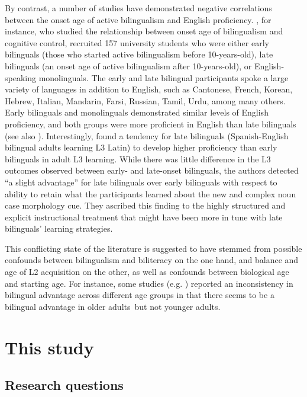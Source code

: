 \documentclass[output=paper,modfonts,nonflat,newtxmath]{langsci/langscibook}
\begin{document}
By contrast, a number of studies have demonstrated negative correlations between the onset age of active bilingualism and English proficiency. \citet{LukEtAl2011}, for instance, who studied the relationship between onset age of bilingualism and cognitive control, recruited 157 university students who were either early bilinguals (those who started active bilingualism before 10-years-old), late bilinguals (an onset age of active bilingualism after 10-years-old), or English-speaking monolinguals. The early and late bilingual participants spoke a large variety of languages in addition to English, such as Cantonese, French, Korean, Hebrew, Italian, Mandarin, Farsi, Russian, Tamil, Urdu, among many others. Early bilinguals and monolinguals demonstrated similar levels of English proficiency, and both groups were more proficient in English than late bilinguals (see also \citealt{SoveriEtAl2011}). Interestingly, \citet[179]{StaffordEtAl2010} found a tendency for late bilinguals (Spanish-English bilingual adults learning L3 Latin) to develop higher proficiency than early bilinguals in adult L3 learning. While there was little difference in the L3 outcomes observed between early- and late-onset bilinguals, the authors detected “a slight advantage” for late bilinguals over early bilinguals with respect to ability to retain what the participants learned about the new and complex noun case morphology cue. They ascribed this finding to the highly structured and explicit instructional treatment that might have been more in tune with late bilinguals’ learning strategies.

This conflicting state of the literature is suggested to have stemmed from possible confounds between bilingualism and biliteracy on the one hand, and balance and age of L2 acquisition on the other, as well as confounds between biological age and starting age. For instance, some studies (e.g. \citealt{BialystokEtAl2005b}) reported an inconsistency in bilingual advantage across different age groups in that there seems to be a bilingual advantage in older adults~but not younger adults.

\section{This study}
\label{sec:pfenninger:3}

\subsection{Research questions}
\label{sec:pfenninger:3.1.}
\end{document}
